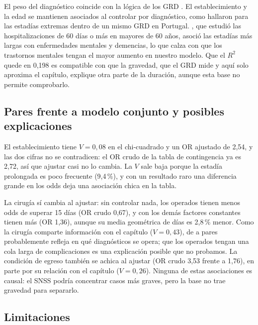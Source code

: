 \documentclass[10.5pt,a4paper,headings=small,abstract=false,bibliography=totoc,listof=totoc]{scrartcl}
\newcommand{\pct}{\,\%}
\begin{document}
El peso del diagnóstico coincide con la lógica de los GRD \citep{fetter1980}. El establecimiento y la edad se mantienen asociados al controlar por diagnóstico, como hallaron \citet{freitas2012} para las estadías extremas dentro de un mismo GRD en Portugal. \citet{olivares2020}, que estudió las hospitalizaciones de 60 días o más en mayores de 60 años, asoció las estadías más largas con enfermedades mentales y demencias, lo que calza con que los trastornos mentales tengan el mayor aumento en nuestro modelo. Que el $R^2$ quede en 0,198 es compatible con que la gravedad, que el GRD mide y aquí solo aproxima el capítulo, explique otra parte de la duración, aunque esta base no permite comprobarlo.

\subsection{Pares frente a modelo conjunto y posibles explicaciones}

El establecimiento tiene $V=0{,}08$ en el chi-cuadrado y un OR ajustado de 2,54, y las dos cifras no se contradicen: el OR crudo de la tabla de contingencia ya es 2,72, así que ajustar casi no lo cambia. La $V$ sale baja porque la estadía prolongada es poco frecuente (9,4\pct{}), y con un resultado raro una diferencia grande en los odds deja una asociación chica en la tabla.

La cirugía sí cambia al ajustar: sin controlar nada, los operados tienen menos odds de superar 15 días (OR crudo 0,67), y con los demás factores constantes tienen más (OR 1,36), aunque su media geométrica de días es 2,8\pct{} menor. Como la cirugía comparte información con el capítulo ($V=0{,}43$), de a pares probablemente refleja en qué diagnósticos se opera; que los operados tengan una cola larga de complicaciones es una explicación posible que no probamos. La condición de egreso también se achica al ajustar (OR crudo 3,53 frente a 1,76), en parte por su relación con el capítulo ($V=0{,}26$). Ninguna de estas asociaciones es causal: el SNSS podría concentrar casos más graves, pero la base no trae gravedad para separarlo.

\subsection{Limitaciones}
\end{document}
